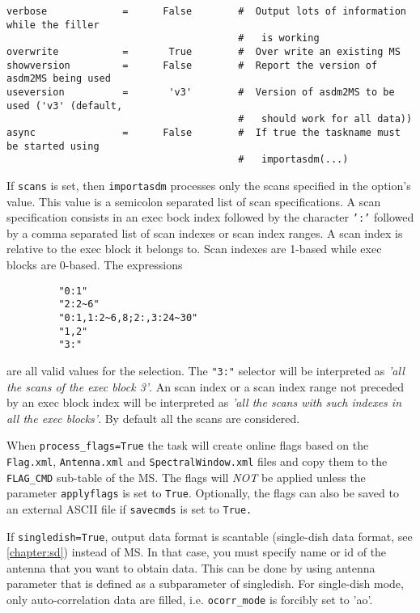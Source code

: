 \begin{verbatim}
verbose             =      False        #  Output lots of information while the filler
                                        #   is working
overwrite           =       True        #  Over write an existing MS
showversion         =      False        #  Report the version of asdm2MS being used
useversion          =       'v3'        #  Version of asdm2MS to be used ('v3' (default,
                                        #   should work for all data))
async               =      False        #  If true the taskname must be started using
                                        #   importasdm(...)

\end{verbatim}
\normalsize

If {\tt scans} is set, then {\tt importasdm} processes only the scans
specified in the option's value. This value is a semicolon separated
list of scan specifications. A scan specification consists in an exec
bock index followed by the character {\tt ':'} followed by a comma separated
list of scan indexes or scan index ranges. A scan index is relative to
the exec block it belongs to. Scan indexes are 1-based while exec
blocks are 0-based. The expressions
\begin{verbatim}
         "0:1"
         "2:2~6"
         "0:1,1:2~6,8;2:,3:24~30"
         "1,2"
         "3:"
\end{verbatim}
are all valid values for the selection. The {\tt "3:"} selector will be interpreted
as {\it 'all the scans of the exec block 3'}. An scan index or a scan index
range not preceded by an exec block index will be interpreted as {\it 'all
the scans with such indexes in all the exec blocks'}.  By default all
the scans are considered.

When {\tt process\_flags=True} the task will create online flags based
on the {\tt Flag.xml}, {\tt Antenna.xml} and {\tt SpectralWindow.xml}
files and copy them to the {\tt FLAG\_CMD} sub-table of the MS. The
flags will {\it NOT} be applied unless the parameter {\tt applyflags}
is set to {\tt True}.  Optionally, the flags can also be saved to an
external ASCII file if {\tt savecmds} is set to {\tt True.}


If {\tt singledish=True}, output data format is scantable (single-dish data
format, see \ref{chapter:sd}) instead of MS. In that case, you must specify
name or id of the antenna that you want to obtain data. This can be
done by using antenna parameter that is defined as a subparameter of
singledish. For single-dish mode, only auto-correlation data are
filled, i.e. {\tt ocorr\_mode} is forcibly set to 'ao'. 

